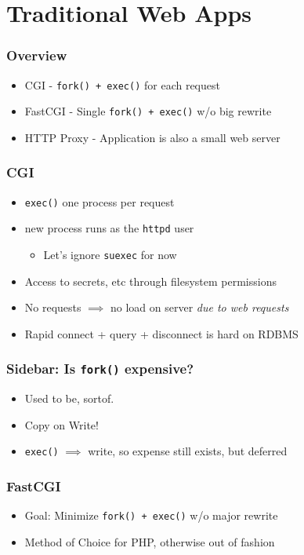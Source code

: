 \documentclass{beamer}
\begin{document}
\section{Traditional Web Apps}
\frame{\sectionpage}

\begin{frame}
	\frametitle{Overview}
	\begin{itemize}
		\item CGI - \texttt{fork() + exec()} for each request
		\pause \item FastCGI - Single \texttt{fork() + exec()} w/o big rewrite
		\pause \item HTTP Proxy - Application is also a small web server
	\end{itemize}
\end{frame}

\begin{frame}
	\frametitle{CGI}
	\begin{itemize}
		\item \texttt{exec()} one process per request
		\pause \item new process runs as the \texttt{httpd} user
			\begin{itemize}
				\item Let's ignore \texttt{suexec} for now
			\end{itemize}
		\pause \item Access to secrets, etc through filesystem permissions
		\pause \item No requests $\implies$ no load on server \emph{due to web requests}
		\pause \item Rapid connect + query + disconnect is hard on RDBMS
	\end{itemize}
\end{frame}

\begin{frame}
	\frametitle{Sidebar: Is \texttt{fork()} expensive?}
	\begin{itemize}
		\pause \item Used to be, sortof.
		\pause \item Copy on Write!
		\pause \item \texttt{exec()} $\implies$ write, so expense still exists, but deferred
	\end{itemize}
\end{frame}

\begin{frame}
	\frametitle{FastCGI}
	\begin{itemize}
		\item Goal: Minimize \texttt{fork() + exec()} w/o major rewrite
		\pause \item Method of Choice for PHP, otherwise out of fashion
	\end{itemize}
\end{frame}
\end{document}
